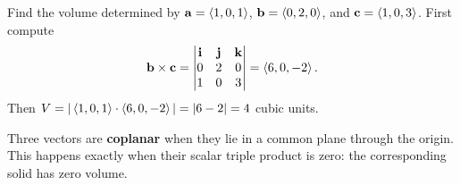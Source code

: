 \documentclass[11pt]{article}
\begin{document}
\begin{example}{Find the volume determined by
$\mathbf{a}=\left\langle 1,0,1\right\rangle$, $\mathbf{b}=\left\langle 0,2,0\right\rangle$, and $\mathbf{c}=\left\langle 1,0,3\right\rangle$.}
First compute
\[
 \mathbf{b}\times\mathbf{c}
 =\begin{vmatrix}\mathbf{i}&\mathbf{j}&\mathbf{k}\\0&2&0\\1&0&3\end{vmatrix}
 =\left\langle 6,0,-2\right\rangle.
\]
Then $V=|\left\langle 1,0,1\right\rangle\cdot\left\langle 6,0,-2\right\rangle|=|6-2|=4$ cubic units.
\end{example}

Three vectors are \textbf{coplanar} when they lie in a common plane through
the origin. This happens exactly when their scalar triple product is zero:
the corresponding solid has zero volume.
\end{document}
